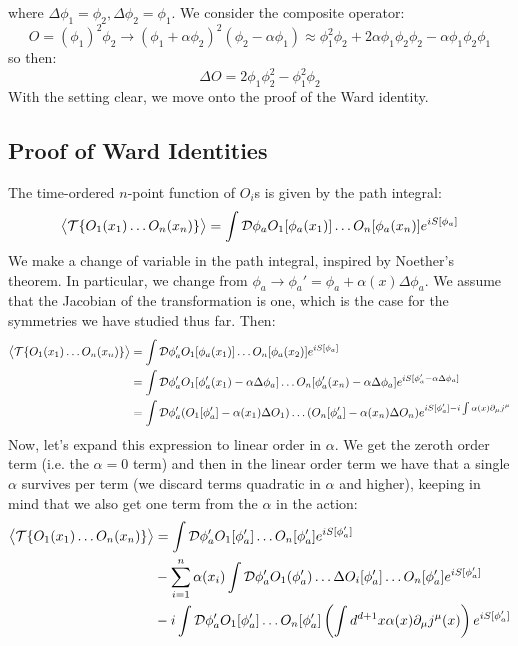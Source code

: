 where $\Delta \phi_1 = \phi_2, \Delta \phi_2 = \phi_1$. We consider the composite operator:
\begin{equation}
    O = (\phi_1)^2 \phi_2 \to (\phi_1 + \alpha\phi_2)^2(\phi_2 - \alpha \phi_1) \approx \phi_1^2 \phi_2 + 2\alpha\phi_1\phi_2\phi_2 - \alpha \phi_1 \phi_2 \phi_1
\end{equation}
so then:
\begin{equation}
    \Delta O = 2\phi_1 \phi_2^2 - \phi_1^2 \phi_2
\end{equation}
With the setting clear, we move onto the proof of the Ward identity.

\subsection{Proof of Ward Identities}
The time-ordered $n$-point function of $O_i$s is given by the path integral:
\begin{equation}
    \left< \mathcal{T}\{O_1(x_1)\ldots O_n(x_n)\} \right> = \int \mathcal{D}\phi_a O_1[\phi_a(x_1)] \ldots O_n[\phi_a(x_n)]e^{iS[\phi_a]}
\end{equation}
We make a change of variable in the path integral, inspired by Noether's theorem. In particular, we change from $\phi_a \to \phi_a' = \phi_a + \alpha(x)\Delta \phi_a$. We assume that the Jacobian of the transformation is one, which is the case for the symmetries we have studied thus far. Then:
\begin{equation}
    \begin{split}
        \left< \mathcal{T}\{O_1(x_1)\ldots O_n(x_n)\} \right> &= \int \mathcal{D}\phi_a'O_1[\phi_a(x_1)]\ldots O_n[\phi_a(x_2)] e^{iS[\phi_a]}
        \\ &= \int \mathcal{D}\phi_a'O_1[\phi_a'(x_1) - \alpha \Delta \phi_a]\ldots O_n[\phi_a'(x_n) - \alpha \Delta \phi_a] e^{iS[\phi_a' - \alpha \Delta \phi_a]}
        \\ &= \int \mathcal{D}\phi_a' (O_1[\phi_a'] - \alpha(x_1)\Delta O_1)\ldots (O_n[\phi_a'] - \alpha(x_n)\Delta O_n)e^{iS[\phi_a'] - i\int \alpha(x) \partial_\mu j^\mu}
    \end{split}
\end{equation}
Now, let's expand this expression to linear order in $\alpha$. We get the zeroth order term (i.e. the $\alpha = 0$ term) and then in the linear order term we have that a single $\alpha$ survives per term (we discard terms quadratic in $\alpha$ and higher), keeping in mind that we also get one term from the $\alpha$ in the action:
\begin{equation}
    \begin{split}
        \left< \mathcal{T}\{O_1(x_1)\ldots O_n(x_n)\} \right> &= \int \mathcal{D}\phi_a' O_1[\phi_a'] \ldots O_n[\phi_a'] e^{iS[\phi_a']} 
        \\ &- \sum_{i=1}^n\alpha(x_i)\int \mathcal{D}\phi_a'O_1(\phi_a') \ldots \Delta O_i[\phi_a'] \ldots O_n[\phi_a'] e^{iS[\phi_a']}
        \\ &- i\int \mathcal{D}\phi_a' O_1[\phi_a']\ldots O_n[\phi_a']\left(\int d^{d+1}x \alpha(x)\partial_\mu j^\mu(x)\right)e^{iS[\phi_a']}
    \end{split}
\end{equation}
